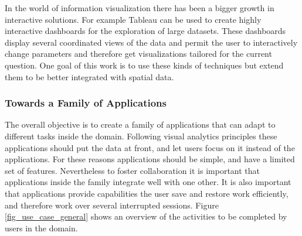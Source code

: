 In the world of information visualization there has been a bigger growth in interactive solutions. For example Tableau \autocite{hanrahan_tableau_2003} can be used to create highly interactive dashboards for the exploration of large datasets. These dashboards display several coordinated views of the data and permit the user to interactively change parameters and therefore get visualizations tailored for the current question. One goal of this work is to use these kinds of techniques but extend them to be better integrated with spatial data. 



\subsubsection{Towards a Family of Applications}

The overall objective is to create a family of applications that can adapt to different tasks inside the domain. Following visual analytics principles these applications should put the data at front, and let users focus on it instead of the applications. For these reasons applications should be simple, and have a limited set of features. Nevertheless to foster collaboration it is important that applications inside the family integrate well with one other. It is also important that applications provide capabilities the user save and restore work efficiently, and therefore work over several interrupted sessions. Figure \ref{fig_use_case_general} shows an overview of the activities to be completed by users in the domain.

